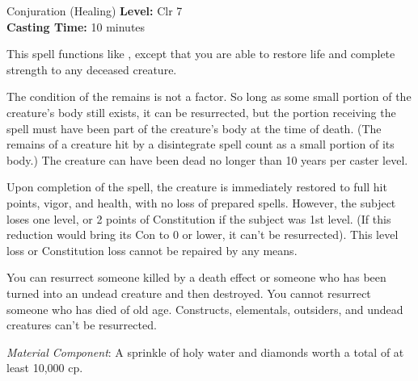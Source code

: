 {Conjuration (Healing)}
{
	\textbf{Level:}
	Clr 7\\
	\textbf{Casting Time:}
	10 minutes\\
}
{
	This spell functions like , except that you are able to restore life and complete strength to any deceased creature.

	The condition of the remains is not a factor. So long as some small portion of the creature's body still exists, it can be resurrected, but the portion receiving the spell must have been part of the creature's body at the time of death. (The remains of a creature hit by a disintegrate spell count as a small portion of its body.) The creature can have been dead no longer than 10 years per caster level.

	Upon completion of the spell, the creature is immediately restored to full hit points, vigor, and health, with no loss of prepared spells. However, the subject loses one level, or 2 points of Constitution if the subject was 1st level. (If this reduction would bring its Con to 0 or lower, it can't be resurrected). This level loss or Constitution loss cannot be repaired by any means.

	You can resurrect someone killed by a death effect or someone who has been turned into an undead creature and then destroyed. You cannot resurrect someone who has died of old age. Constructs, elementals, outsiders, and undead creatures can't be resurrected.

	\textit{Material Component}:
	A sprinkle of holy water and diamonds worth a total of at least 10,000 cp.

}
